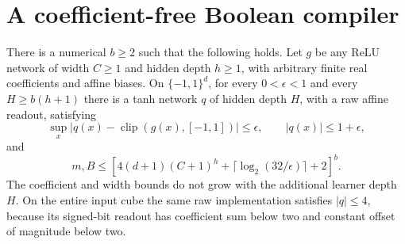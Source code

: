 \section{A coefficient-free Boolean compiler}
\begin{lemma}\label{lem:raw-Boolean-tanh}
There is a numerical $b\ge2$ such that the following holds.  Let $g$ be any
ReLU network of width $C\ge1$ and hidden depth $h\ge1$, with arbitrary
finite real coefficients and affine biases.  On $\{-1,1\}^d$, for every
$0<\epsilon<1$ and every $H\ge b(h+1)$ there is a tanh network $q$ of
hidden depth $H$, with a raw affine readout, satisfying
\[
 \sup_x|q(x)-\operatorname{clip}(g(x),[-1,1])|\le\epsilon,
 \qquad |q(x)|\le1+\epsilon,
\]
and
\[
 m,B\le\left[4(d+1)(C+1)^h
              +\lceil\log_2(32/\epsilon)\rceil+2\right]^b.
\]
The coefficient and width bounds do not grow with the additional learner
depth $H$.  On the entire input cube the same raw implementation satisfies
$|q|\le4$, because its signed-bit readout has coefficient sum below two
and constant offset of magnitude below two.
\end{lemma}
